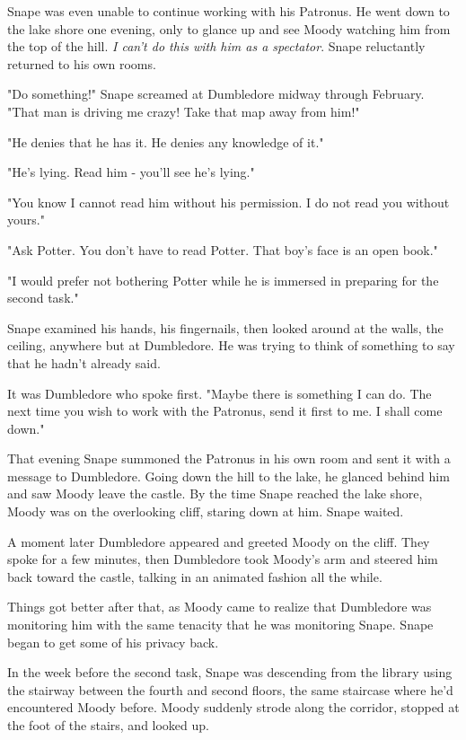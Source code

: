 \documentclass[a4paper,11pt]{article}
\begin{document}
Snape was even unable to continue working with his Patronus. He went down to the lake shore one evening, only to glance up and see Moody watching him from the top of the hill. \emph{I can't do this with him as a spectator}. Snape reluctantly returned to his own rooms.

"Do something!" Snape screamed at Dumbledore midway through February. "That man is driving me crazy! Take that map away from him!"

"He denies that he has it. He denies any knowledge of it."

"He's lying. Read him - you'll see he's lying."

"You know I cannot read him without his permission. I do not read you without yours."

"Ask Potter. You don't have to read Potter. That boy's face is an open book."

"I would prefer not bothering Potter while he is immersed in preparing for the second task."

Snape examined his hands, his fingernails, then looked around at the walls, the ceiling, anywhere but at Dumbledore. He was trying to think of something to say that he hadn't already said.

It was Dumbledore who spoke first. "Maybe there is something I can do. The next time you wish to work with the Patronus, send it first to me. I shall come down."

That evening Snape summoned the Patronus in his own room and sent it with a message to Dumbledore. Going down the hill to the lake, he glanced behind him and saw Moody leave the castle. By the time Snape reached the lake shore, Moody was on the overlooking cliff, staring down at him. Snape waited.

A moment later Dumbledore appeared and greeted Moody on the cliff. They spoke for a few minutes, then Dumbledore took Moody's arm and steered him back toward the castle, talking in an animated fashion all the while.

Things got better after that, as Moody came to realize that Dumbledore was monitoring him with the same tenacity that he was monitoring Snape. Snape began to get some of his privacy back.

In the week before the second task, Snape was descending from the library using the stairway between the fourth and second floors, the same staircase where he'd encountered Moody before. Moody suddenly strode along the corridor, stopped at the foot of the stairs, and looked up.
\end{document}
